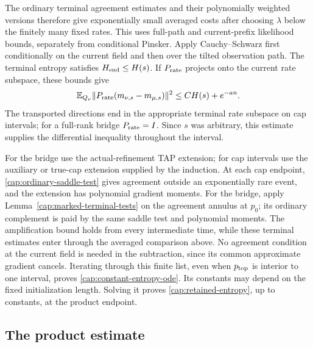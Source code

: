 The ordinary terminal agreement estimates and their polynomially weighted
versions therefore give exponentially small averaged costs after choosing
$\lambda$ below the finitely many fixed rates. This uses full-path and
current-prefix likelihood bounds, separately from conditional Pinsker.
Apply Cauchy--Schwarz first conditionally on
the current field and then over the tilted observation path. The terminal
entropy satisfies $H_{\rm end}\le H(s)$. If $P_{\rm rate}$ projects onto the
current rate subspace, these bounds give
\[
 \mathbb E_{Q_\nu}\|P_{\rm rate}(m_{\nu,s}-m_{\mu,s})\|^2
 \le C H(s)+e^{-an}.
\]
The transported directions end in the appropriate terminal rate subspace on
cap intervals; for a full-rank bridge $P_{\rm rate}=I$. Since $s$ was
arbitrary, this estimate supplies the differential inequality throughout
the interval.

For the bridge use the actual-refinement TAP extension; for cap intervals use
the auxiliary or true-cap extension supplied by the induction. At each cap
endpoint, \eqref{cap:ordinary-saddle-test} gives agreement outside an
exponentially rare event, and the extension has polynomial gradient moments.
For the bridge, apply Lemma~\ref{cap:marked-terminal-tests}
on the agreement annulus at $p_0$; its ordinary complement is paid by the same
saddle test and polynomial moments. The amplification bound holds from every
intermediate time, while these terminal estimates enter through the averaged
comparison above. No agreement condition at the current field is needed in
the subtraction, since its common approximate gradient cancels.
Iterating through this finite list, even when $p_{\rm
top}$ is interior to one interval, proves \eqref{cap:constant-entropy-ode}.
Its constants may depend on the fixed initialization length. Solving it proves
\eqref{cap:retained-entropy}, up to constants, at the product endpoint.

\subsection{The product estimate}\label{cap:product-estimate}


